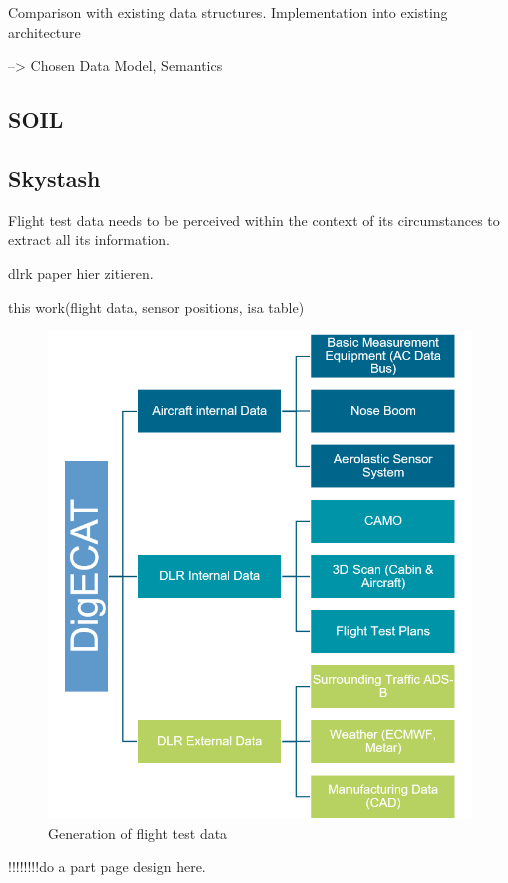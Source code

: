 Comparison with existing data structures. Implementation into existing architecture

--> Chosen Data Model, Semantics



\subsection{SOIL}

\subsection{Skystash}
\label{chap:skystash}

Flight test data needs to be perceived within the context of its circumstances to extract all its information.

dlrk paper hier zitieren.

this work(flight data, sensor positions, isa table)

\begin{figure}[h]
    \centering
    \includegraphics[width=\textwidth]{03_figures/DIGECAT}
    \caption{Generation of flight test data \cite{arts_digital_nodate} }
    \label{fig:digecat_data_sources}
\end{figure}
!!!!!!!!do a part page design here.


